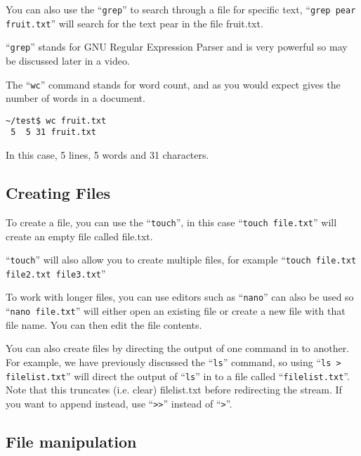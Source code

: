 \documentclass{book}
\begin{document}
You can also use the ``\verb|grep|'' to search through a file for specific text,
``\verb|grep pear fruit.txt|'' will search for the text pear in the file fruit.txt.

``\verb|grep|'' stands for GNU Regular Expression Parser and is very powerful so may be discussed later in a video.

The ``\verb|wc|'' command stands for word count, and as you would expect gives the number of words in a document.

\begin{verbatim}
~/test$ wc fruit.txt
 5  5 31 fruit.txt
\end{verbatim}

In this case, 5 lines, 5 words and 31 characters.



\subsection{Creating Files}

To create a file, you can use the ``\verb|touch|'', in this case ``\verb|touch file.txt|'' will create an empty file called file.txt.

``\verb|touch|'' will also allow you to create multiple files, for example ``\verb|touch file.txt file2.txt file3.txt|''

To work with longer files, you can use editors such as ``\verb|nano|'' can also be used so ``\verb|nano file.txt|'' will either open an existing file or create a new file with that file name. You can then edit the file contents.

You can also create files by directing the output of one command in to another. For example, we have previously discussed the ``\verb|ls|'' command, so using ``\verb|ls > filelist.txt|'' will direct the output of ``\verb|ls|'' in to a file called ``\verb|filelist.txt|''. Note that this truncates (i.e. clear) filelist.txt before redirecting the stream. If you want to append instead, use ``\verb|>>|'' instead of ``\verb|>|''.


\subsection{File manipulation}
\end{document}
